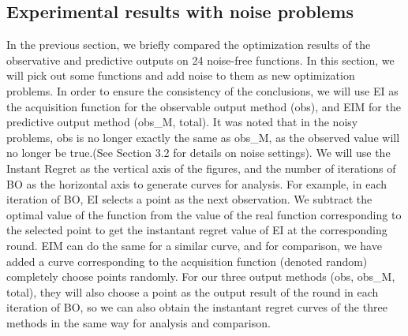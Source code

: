 \documentclass{article}
\begin{document}
  \subsection{Experimental results with noise problems}
  \hspace{2em}In the previous section, we briefly compared the optimization results of the observative and predictive outputs on 24 noise-free functions. In this section, we will pick out some functions and add noise to them as new optimization problems. In order to ensure the consistency of the conclusions, we will use EI as the acquisition function for the observable output method (obs), and EIM for the predictive output method (obs\_M, total). It was noted that in the noisy problems, obs is no longer exactly the same as obs\_M, as the observed value will no longer be true.(See Section 3.2 for details on noise settings). We will use the Instant Regret as the vertical axis of the figures, and the number of iterations of BO as the horizontal axis to generate curves for analysis. For example, in each iteration of BO, EI selects a point as the next observation. We subtract the optimal value of the function from the value of the real function corresponding to the selected point to get the instantant regret value of EI at the corresponding round. EIM can do the same for a similar curve, and for comparison, we have added a curve corresponding to the acquisition function (denoted random) completely choose points randomly. For our three output methods (obs, obs\_M, total), they will also choose a point as the output result of the round in each iteration of BO, so we can also obtain the instantant regret curves of the three methods in the same way for analysis and comparison.
  
\end{document}
